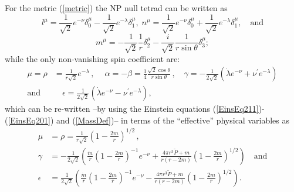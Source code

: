 \documentclass[notitlepage,letterpaper, 10pt]{article}
\begin{document}
For the metric (\ref{metric}) the NP null tetrad  can be written as 
\begin{equation}
l^{\mu}  = \frac{1}{\sqrt{2}} e^{-\nu} \delta^{\mu }_{0 } - \frac{1}{\sqrt{2}} e^{-\lambda} \delta^{\mu }_{1}, \; n^{\mu} = \frac{1}{\sqrt{2}} e^{-\nu} \delta^{\mu }_{0 } +  \frac{1}{\sqrt{2}} e^{-\lambda} \delta^{\mu }_{1 },  \quad \textrm{and}  
\end{equation}
\begin{equation}
m^{\mu }= -\frac{1}{\sqrt{2}}\frac{1}{r} \delta^{\mu }_{2 } - \frac{i}{\sqrt{2}}  \frac{1}{r \sin \theta}    \delta^{\mu }_{3};    
\label{NPTetrad}
\end{equation}
while the only non-vanishing spin coefficient are:
\begin{align*}
\mu = \rho & = \frac{1}{r\sqrt{2}} e^{-\lambda}\, , \quad \ \alpha = -\beta = \frac{1}{4}\frac{\sqrt{2}\cos\theta}{r \sin\theta}\, , \quad 
 \gamma  =    -\frac{1}{2 \sqrt{2}} \left(  \dot{\lambda} e^{-\nu} +  \nu^{\prime} e^{-\lambda} \right) \\  \textrm{and} & \quad     \epsilon = \frac{1}{2 \sqrt{2}} \left(  \dot{\lambda} e^{-\nu} -  \nu^{\prime} e^{-\lambda} \right),
\end{align*}
which can be re-written --by using the Einstein equations (\ref{EinsEq211})-(\ref{EinsEq201}) and (\ref{MassDef})-- in terms of the ``effective'' physical variables as
\begin{align}
\mu & = \rho = \frac{1}{r\sqrt{2}} \left( 1-\frac{2 m}{r}\right)^{1/2} \, , \label{Spinmu} \\
  \gamma  & = -\frac{1}{2\sqrt{2}} \left( \frac{\dot{m}}{r}\left( 1-\frac{2 m}{r}\right)^{-1}  e^{-\nu}  + \frac{4\pi r^{3} \tilde{P}+m}{r(r-2m)}\left( 1-\frac{2 m}{r}\right)^{1/2} \right) \quad \textrm{and} \label{Spingamma} \\
  \epsilon & = \frac{1}{2\sqrt{2}} \left( \frac{\dot{m}}{r} \left( 1-\frac{2 m}{r}\right)^{-1} e^{-\nu}  - \frac{4\pi r^{3} \tilde{P}+m}{r(r-2m)}\left( 1-\frac{2 m}{r}\right)^{1/2} \right). \label{Spinepsilon}
\end{align}
\end{document}
